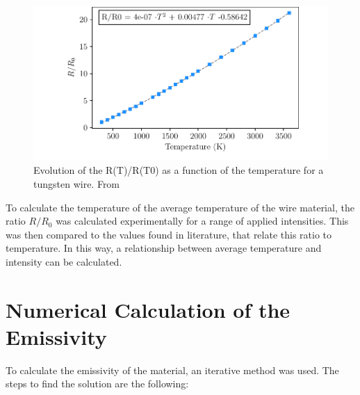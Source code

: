 \begin{figure}[h]
    \centering
    \includegraphics[width=1.0\columnwidth]{Figure_LiteratureResTemp/RR0Tungsten.pdf}
    \caption{Evolution of the R(T)/R(T0) as a function of the temperature for a tungsten wire. From \parencite*[][]{ref:HandbookCh}}
    \label{fig:RR0TungstenLit}
\end{figure}

To calculate the temperature of the average temperature of the wire material, the ratio $R/R_{0}$ was calculated experimentally for a range of applied intensities.  This was then compared to the values found in literature, that relate this ratio to temperature. In this way, a relationship between average temperature and intensity can be calculated. 

\section{Numerical Calculation of the Emissivity}
\label{sec:EmissCalc}

To calculate the emissivity of the material, an iterative method was used. The steps to find the solution are the following: 

